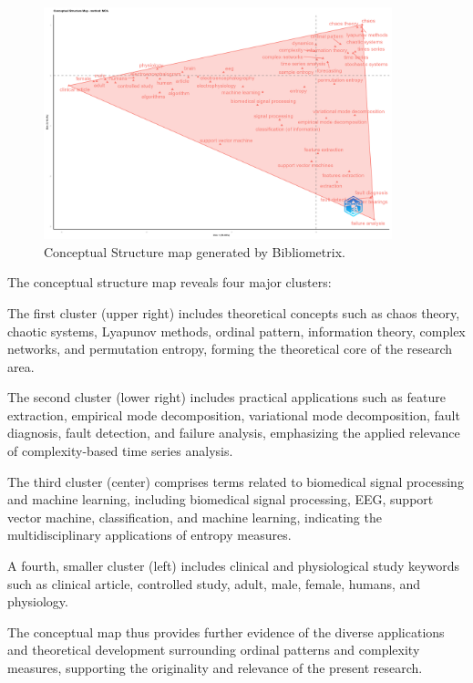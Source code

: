 \begin{figure}[H]
	\centering
	\includegraphics[width=0.9\textwidth]{FactorialMap}
	\caption{Conceptual Structure map generated by Bibliometrix.}
	\label{fig:factorialMap}
\end{figure}

The conceptual structure map reveals four major clusters:

The first cluster (upper right) includes theoretical concepts such as chaos theory, chaotic systems, Lyapunov methods, ordinal pattern, information theory, complex networks, and permutation entropy, forming the theoretical core of the research area.

The second cluster (lower right) includes practical applications such as feature extraction, empirical mode decomposition, variational mode decomposition, fault diagnosis, fault detection, and failure analysis, emphasizing the applied relevance of complexity-based time series analysis.

The third cluster (center) comprises terms related to biomedical signal processing and machine learning, including biomedical signal processing, EEG, support vector machine, classification, and machine learning, indicating the multidisciplinary applications of entropy measures.

A fourth, smaller cluster (left) includes clinical and physiological study keywords such as clinical article, controlled study, adult, male, female, humans, and physiology.

The conceptual map thus provides further evidence of the diverse applications and theoretical development surrounding ordinal patterns and complexity measures, supporting the originality and relevance of the present research.

